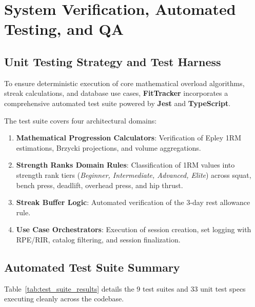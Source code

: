 \section{System Verification, Automated Testing, and QA}

\subsection{Unit Testing Strategy and Test Harness}
To ensure deterministic execution of core mathematical overload algorithms, streak calculations, and database use cases, \textbf{FitTracker} incorporates a comprehensive automated test suite powered by \textbf{Jest} and \textbf{TypeScript}.

The test suite covers four architectural domains:
\begin{enumerate}
    \item \textbf{Mathematical Progression Calculators}: Verification of Epley 1RM estimations, Brzycki projections, and volume aggregations.
    \item \textbf{Strength Ranks Domain Rules}: Classification of 1RM values into strength rank tiers (\textit{Beginner, Intermediate, Advanced, Elite}) across squat, bench press, deadlift, overhead press, and hip thrust.
    \item \textbf{Streak Buffer Logic}: Automated verification of the 3-day rest allowance rule.
    \item \textbf{Use Case Orchestrators}: Execution of session creation, set logging with RPE/RIR, catalog filtering, and session finalization.
\end{enumerate}

\subsection{Automated Test Suite Summary}
Table~\ref{tab:test_suite_results} details the 9 test suites and 33 unit test specs executing cleanly across the codebase.

